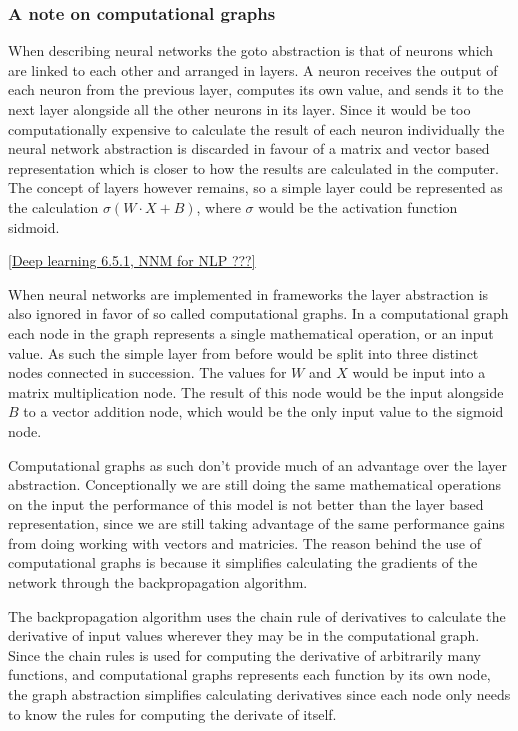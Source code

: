 \subsubsection*{A note on computational graphs}

When describing neural networks the goto abstraction is that of neurons which
are linked to each other and arranged in layers. A neuron receives the output of
each neuron from the previous layer, computes its own value, and sends it to the
next layer alongside all the other neurons in its layer. Since it would be too
computationally expensive to calculate the result of each neuron individually
the neural network abstraction is discarded in favour of a matrix and vector
based representation which is closer to how the results are calculated in the
computer. The concept of layers however remains, so a simple layer could be
represented as the calculation $\sigma(W \cdot X + B)$, where $\sigma$ would be
the activation function sidmoid. 

\ref{Deep learning 6.5.1, NNM for NLP ???}

When neural networks are implemented in frameworks the layer abstraction is also
ignored in favor of so called computational graphs. In a computational graph
each node in the graph represents a single mathematical operation, or an input
value. As such the simple layer from before would be split into three distinct
nodes connected in succession. The values for $W$ and $X$ would be input into a
matrix multiplication node. The result of this node would be the input alongside
$B$ to a vector addition node, which would be the only input value to the
sigmoid node. 

Computational graphs as such don't provide much of an advantage over the layer
abstraction. Conceptionally we are still doing the same mathematical operations
on the input the performance of this model is not better than the layer based
representation, since we are still taking advantage of the same performance
gains from doing working with vectors and matricies. The reason behind the use
of computational graphs is because it simplifies calculating the gradients of
the network through the backpropagation algorithm. 

The backpropagation algorithm uses the chain rule of derivatives to calculate
the derivative of input values wherever they may be in the computational graph.
Since the chain rules is used for computing the derivative of arbitrarily many
functions, and computational graphs represents each function by its own node,
the graph abstraction simplifies calculating derivatives since each node only
needs to know the rules for computing the derivate of itself.
 

